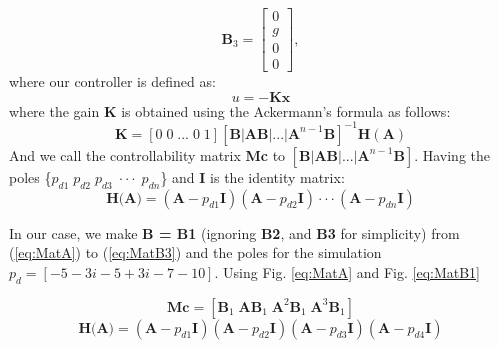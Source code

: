 \documentclass[12pt,a4paper]{cibb}
\begin{document}
\begin{equation} \label{eq:MatB3}
         \textbf{B}_3 =       \begin{bmatrix}
                             0 \\
                             g \\
                             0 \\
                             0 
                             \end{bmatrix},
\end{equation}
where our controller is defined as:
\begin{equation} \label{eq:Uctrl}
u = -\textbf{Kx}
\end{equation}
where the gain \textbf{K} is obtained using the Ackermann’s formula as follows:
\begin{equation} \label{eq:Uctrl_}
\textbf{K} = [0 \; 0\; ...\; 0 \; 1][\textbf{B}|\textbf{AB}|...|\textbf{A}^{n-1}\textbf{B}]^{-1}\textbf{H}(\textbf{A})
\end{equation}
And we call the controllability matrix \textbf{Mc} to \([\textbf{B}|\textbf{AB}|...|\textbf{A}^{n-1}\textbf{B}]\). Having the poles \{\(p_{d1} \; p_{d2} \; p_{d3}\;\cdot\cdot\cdot\;p_{dn}\)\} and \textbf{I} is the identity matrix:
\begin{equation} \label{eq:HA}
\textbf{H(A)} = (\textbf{A}-p_{d1}\textbf{I})(\textbf{A}-p_{d2}\textbf{I})\cdot\cdot\cdot(\textbf{A}-p_{dn}\textbf{I})
\end{equation}

In our case, we make \textbf{B = B1} (ignoring \textbf{B2}, and \textbf{B3} for simplicity) from  (\ref{eq:MatA}) to  (\ref{eq:MatB3}) and the poles for the simulation \(p_d=[-5-3i -5+3i-7 -10]\).
Using Fig. \ref{eq:MatA} and Fig. \ref{eq:MatB1}


\begin{equation} \label{eq:Mc1}
\textbf{Mc} = [\textbf{B}_1 \; \textbf{AB}_1 \; \textbf{A}^2\textbf{B}_1 \; \textbf{A}^3\textbf{B}_1]
\end{equation}
\begin{equation} \label{eq:HA1}
\textbf{H(A)} = (\textbf{A}-p_{d1}\textbf{I})(\textbf{A}-p_{d2}\textbf{I})(\textbf{A}-p_{d3}\textbf{I})(\textbf{A}-p_{d4}\textbf{I})
\end{equation}
\end{document}
